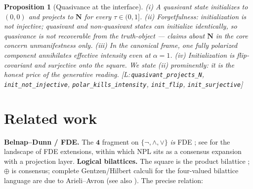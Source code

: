 \documentclass[11pt,a4paper]{article}
\newtheorem{proposition}[theorem]{Proposition}
\theoremstyle{definition}
\newcommand{\FOUR}{\mathbf{4}}
\newcommand{\vN}{\mathbf{N}}
\newcommand{\hmz}{\oplus}                       %
\newcommand{\lean}[1]{\texttt{#1}}
\begin{document}
\begin{proposition}[Quasivance at the interface]\label{prop:quasivance}
(i) A quasivant state initializes to $(0,0)$ and projects to $\vN$ for
every $\tau\in(0,1]$. (ii) \emph{Forgetfulness}: initialization is not
injective; quasivant and non-quasivant states can initialize identically,
so quasivance is not recoverable from the truth-object --- claims about
$\vN$ in the core concern unmanifestness only. (iii) In the canonical
frame, one fully polarized component annihilates effective intensity even
at $\alpha=1$. (iv) Initialization is flip-covariant and surjective onto
the square. We state (ii) prominently: it is the honest price of the
generative reading.
[L:\,\lean{quasivant\_projects\_N}, \lean{init\_not\_injective},
\lean{polar\_kills\_intensity}, \lean{init\_flip}, \lean{init\_surjective}]
\end{proposition}

\section{Related work}\label{sec:related}

\textbf{Belnap--Dunn / FDE.} The $\FOUR$ fragment on $\{\lnot,\wedge,\vee\}$
\emph{is} FDE \cite{belnap1977useful,belnap1977computer,dunn1976intuitive};
see \cite{omori2017forty} for the landscape of FDE extensions, within which
NPL sits as a consensus expansion with a projection layer. \textbf{Logical
bilattices.} The square is the product bilattice
\cite{ginsberg1988multivalued,fitting1991bilattices}; $\hmz$ is consensus;
complete Gentzen/Hilbert calculi for the four-valued bilattice language are
due to Arieli--Avron \cite{arieli1996reasoning} (see also
\cite{rivieccio2010algebraic}). The precise relation:
\end{document}
